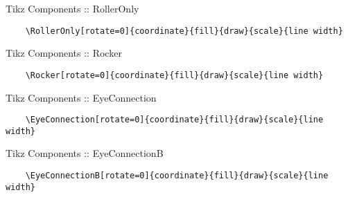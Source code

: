 \documentclass[9pt,xcolor={svgnames, x11names}]{beamer}
\begin{document}
\begin{frame}[fragile]{Tikz Components :: RollerOnly}

  \footnotesize
  \begin{verbatim}
    \RollerOnly[rotate=0]{coordinate}{fill}{draw}{scale}{line width}
  \end{verbatim}

  \vspace{1cm}


\end{frame}

\begin{frame}[fragile]{Tikz Components :: Rocker}

  \footnotesize
  \begin{verbatim}
    \Rocker[rotate=0]{coordinate}{fill}{draw}{scale}{line width}
  \end{verbatim}

  \vspace{1cm}


\end{frame}

\begin{frame}[fragile]{Tikz Components :: EyeConnection}

  \footnotesize
  \begin{verbatim}
    \EyeConnection[rotate=0]{coordinate}{fill}{draw}{scale}{line width}
  \end{verbatim}

  \vspace{1cm}


\end{frame}

\begin{frame}[fragile]{Tikz Components :: EyeConnectionB}

  \small
  \begin{verbatim}
    \EyeConnectionB[rotate=0]{coordinate}{fill}{draw}{scale}{line width}
  \end{verbatim}

  \vspace{1cm}


\end{frame}
\end{document}
